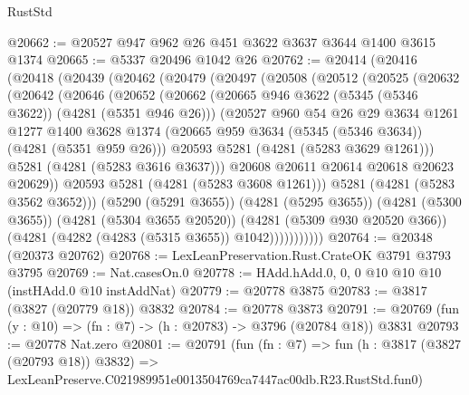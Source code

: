 \begin{lexlean}{RustStd}
\begin{coremodule}
@20662 := @20527 @947 @962 @26 @451 @3622 @3637 @3644 @1400 @3615 @1374
@20665 := @5337 @20496 @1042 @26
@20762 := @20414
    (@20416
      (@20418
        (@20439
          (@20462
            (@20479
              (@20497
                (@20508
                  (@20512
                    (@20525
                      (@20632
                        (@20642
                          (@20646
                            (@20652
                              (@20662
                                (@20665 @946 @3622 (@5345 (@5346 @3622)) (@4281 (@5351 @946 @26)))
                                (@20527
                                  @960
                                  @54
                                  @26
                                  @29
                                  @3634
                                  @1261
                                  @1277
                                  @1400
                                  @3628
                                  @1374
                                  (@20665 @959 @3634 (@5345 (@5346 @3634)) (@4281 (@5351 @959 @26)))
                                  @20593
                                  @5281
                                  (@4281 (@5283 @3629 @1261)))
                                @5281
                                (@4281 (@5283 @3616 @3637)))
                              @20608
                              @20611
                              @20614
                              @20618
                              @20623
                              @20629))
                          @20593
                          @5281
                          (@4281 (@5283 @3608 @1261)))
                        @5281
                        (@4281 (@5283 @3562 @3652)))
                      (@5290 (@5291 @3655))
                      (@4281 (@5295 @3655))
                      (@4281 (@5300 @3655))
                      (@4281 (@5304 @3655 @20520))
                      (@4281 (@5309 @930 @20520 @366))
                      (@4281 (@4282 (@4283 (@5315 @3655)) @1042)))))))))))
@20764 := @20348 (@20373 @20762)
@20768 := LexLeanPreservation.Rust.CrateOK @3791 @3793 @3795
@20769 := Nat.casesOn.{0}
@20778 := HAdd.hAdd.{0, 0, 0} @10 @10 @10 (instHAdd.{0} @10 instAddNat)
@20779 := @20778 @3875
@20783 := @3817 (@3827 (@20779 @18)) @3832
@20784 := @20778 @3873
@20791 := @20769 (fun (y : @10) => (fn : @7) -> (h : @20783) -> @3796 (@20784 @18)) @3831
@20793 := @20778 Nat.zero
@20801 := @20791
    (fun (fn : @7) =>
    fun (h : @3817 (@3827 (@20793 @18)) @3832) =>
    LexLeanPreserve.C021989951e0013504769ca7447ac00db.R23.RustStd.fun0)

\end{coremodule}
\end{lexlean}
